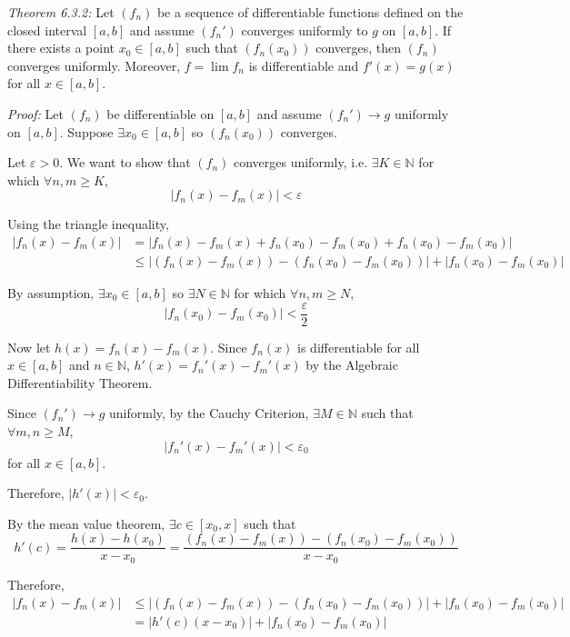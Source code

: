 \documentclass[12pt]{article}
\newcommand{\N}{\mathbb{N}}
\newcommand{\abs}[1]{\left\vert #1 \right\vert}
\newcommand{\ep}{\varepsilon}
\begin{document}
    \color{blue}
        \emph{Theorem 6.3.2:} Let $(f_n)$ be a sequence of differentiable functions defined on the closed interval $[a, b]$ and assume $(f_n')$ converges uniformly to $g$ on $[a, b]$. If there exists a point $x_0\in[a,b]$ such that $(f_n(x_0))$ converges, then $(f_n)$ converges uniformly. Moreover, $f = \lim f_n$ is differentiable and $f'(x) = g(x)$ for all $x\in[a,b]$.

        \emph{Proof:} Let $(f_n)$ be differentiable on $[a, b]$ and assume $(f_n') \to g$ uniformly on $[a, b]$. Suppose $\exists x_0 \in [a, b]$ so $(f_n(x_0))$ converges. 
        
        Let $\ep > 0$. We want to show that $(f_n)$ converges uniformly, i.e. $\exists K \in \N$ for which $\forall n, m \geq K$,
        \[\abs{f_n(x) - f_m(x)} < \ep\]

        Using the triangle inequality, 
        \begin{align*}
            \abs{f_n(x) - f_m(x)} &= \abs{f_n(x) - f_m(x) + f_n(x_0) - f_m(x_0) + f_n(x_0) - f_m(x_0)}\\
            &\leq \abs{(f_n(x) - f_m(x)) - (f_n(x_0) - f_m(x_0))} + \abs{f_n(x_0) - f_m(x_0)}
        \end{align*}

        By assumption, $\exists x_0 \in [a, b]$ so $\exists N \in \N$ for which $\forall n, m \geq N$, 
        \[\abs{f_n(x_0) - f_m(x_0)} < \frac{\ep}{2}\] 

        Now let $h(x) = f_n(x) - f_m(x)$. Since $f_n(x)$ is differentiable for all $x \in [a, b]$ and $n \in \N$, $h'(x) = f_n'(x) - f_m'(x)$ by the Algebraic Differentiability Theorem. 
        
        Since $(f_n') \to g$ uniformly, by the Cauchy Criterion, $\exists M \in \N$ such that $\forall m, n \geq M$, 
        \[\abs{f_n'(x) - f_m'(x)} < \ep_0\]
        for all $x \in [a, b]$. 

        Therefore, $\abs{h'(x)} < \ep_0$.  
        
        By the mean value theorem, $\exists c \in [x_0, x]$ such that
        \[h'(c) = \frac{h(x) - h(x_0)}{x - x_0} = \frac{(f_n(x) - f_m(x)) - (f_n(x_0) - f_m(x_0))}{x - x_0}\]

        Therefore, 
        \begin{align*}
            \abs{f_n(x) - f_m(x)} &\leq \abs{(f_n(x) - f_m(x)) - (f_n(x_0) - f_m(x_0))} + \abs{f_n(x_0) - f_m(x_0)}\\ 
            &= \abs{h'(c)(x - x_0)} + \abs{f_n(x_0) - f_m(x_0)}\\
        \end{align*}
\end{document}
